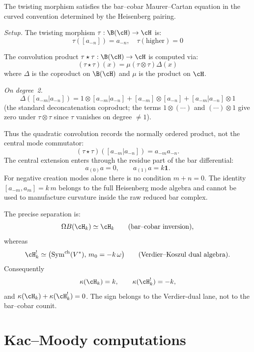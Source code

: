 \begin{computation}The twisting morphism satisfies the bar--cobar Maurer--Cartan equation
in the curved convention determined by the Heisenberg pairing.

\emph{Setup.} The twisting morphism $\tau: \B(\cH) \to \cH$ is:
\[
\tau([a_{-n}]) = a_{-n}, \quad \tau(\text{higher}) = 0
\]

The convolution product $\tau \star \tau: \B(\cH) \to \cH$ is computed via:
\[
(\tau \star \tau)(x) = \mu(\tau \otimes \tau)\Delta(x)
\]
where $\Delta$ is the coproduct on $\B(\cH)$ and $\mu$ is the product on $\cH$.

\emph{On degree~2.}
\[
\Delta([a_{-m}|a_{-n}]) = 1 \otimes [a_{-m}|a_{-n}] + [a_{-m}] \otimes [a_{-n}] + [a_{-m}|a_{-n}] \otimes 1
\]
(the standard deconcatenation coproduct; the terms $1 \otimes (\cdots)$ and $(\cdots) \otimes 1$ give zero under $\tau \otimes \tau$ since $\tau$ vanishes on degree $\neq 1$).

Thus the quadratic convolution records the normally ordered product,
not the central mode commutator:
\[
(\tau \star \tau)([a_{-m}|a_{-n}])
=a_{-m}a_{-n}.
\]
The central extension enters through the residue part of the bar
differential:
\[
a_{(0)}a=0,\qquad a_{(1)}a=k\mathbf 1.
\]
For negative creation modes alone there is no condition $m+n=0$.
The identity $[a_{-m},a_m]=k\,m$ belongs to the full Heisenberg
mode algebra and cannot be used to manufacture curvature inside the
raw reduced bar complex.

The precise separation is:
\[
\Omega B(\cH_k)\simeq \cH_k
\qquad\text{(bar--cobar inversion),}
\]
whereas
\[
\cH_k^! \simeq
\bigl(\mathrm{Sym}^{\mathrm{ch}}(V^*),\,m_0=-k\,\omega\bigr)
\qquad\text{(Verdier--Koszul dual algebra).}
\]
Consequently
\[
\kappa(\cH_k)=k,\qquad
\kappa(\cH_k^!)=-k,
\]
and $\kappa(\cH_k)+\kappa(\cH_k^!)=0$. The sign belongs to the
Verdier-dual lane, not to the bar--cobar counit.
\end{computation}


\section{Kac--Moody computations}

